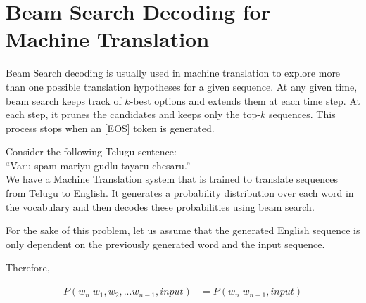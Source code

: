 \documentclass[twoside,10pt]{article}
\begin{document}



\newpage
\section{Beam Search Decoding for Machine Translation}

Beam Search decoding is usually used in machine translation to explore more than one possible translation hypotheses for a given sequence. At any given time, beam search keeps track of $k$-best options and extends them at each time step. At each step, it prunes the candidates and keeps only the top-$k$ sequences. This process stops when an [EOS] token is generated. 

Consider the following Telugu sentence:\\

\qquad \qquad \qquad \qquad \qquad \qquad ``Varu spam mariyu gudlu tayaru chesaru.''\\

We have a Machine Translation system that is trained to translate sequences from Telugu to English. It generates a probability distribution over each word in the vocabulary and then decodes these probabilities using beam search. 

For the sake of this problem, let us assume that the generated English sequence is only dependent on the previously generated word and the input sequence. 

Therefore,

\begin{align}
    P(w_n|w_1, w_2, ... w_{n-1}, input) &= P(w_n|w_{n-1}, input)
\end{align}
\end{document}
